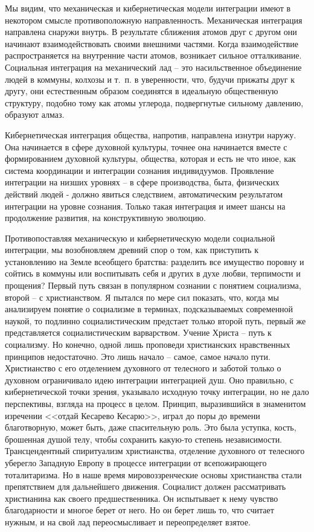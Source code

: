 \documentclass{book}
\begin{document}
Мы видим, что механическая и кибернетическая модели ин­теграции имеют в некотором смысле противоположную на­правленность. Механическая интеграция направлена снаружи внутрь. В результате сближения атомов друг с другом они на­чинают взаимодействовать своими внешними частями. Когда взаимодействие распространяется на внутренние части атомов, возникает сильное отталкивание. Социальная интеграция на механический лад -- это насильственное объединение людей в коммуны, колхозы и т.~п. в уверенности, что, будучи прижаты друг к другу, они естественным образом соединятся в идеаль­ную общественную структуру, подобно тому как атомы углерода, подвергнутые сильному давлению, образуют алмаз.

Кибернетическая интеграция общества, напротив, направ­лена изнутри наружу. Она начинается в сфере духовной куль­туры, точнее она начинается вместе с  формированием духов­ной культуры, общества, которая и есть не что иное, как си­стема координации и интеграции сознания индивидуумов. Про­явление интеграции на низших уровнях -- в сфере производст­ва, быта, физических действий людей - должно явиться следст­вием, автоматическим результатом интеграции на уровне со­знания. Только такая интеграция и имеет шансы на продолже­ние развития, на конструктивную эволюцию.

Противопоставляя механическую и кибернетическую моде­ли социальной интеграции, мы возобновляем древний спор о том, как приступить к установлению на Земле всеобщего братст­ва: разделить все имущество поровну и сойтись в коммуны или воспитывать себя и других в духе любви, терпимости и про­щения? Первый путь связан в популярном сознании с понятием социализма, второй -- с христианством. Я пытался по мере сил показать, что, когда мы анализируем понятие о социализме в терминах, подсказываемых современной наукой, то подлинно социалистическим предстает только второй путь, первый же представляется социалистическим варварством. Учение Христа -- путь к социализму. Но конечно, одной лишь проповеди хри­стианских нравственных принципов недостаточно. Это лишь на­чало -- самое, самое начало пути. Христианство с его отделением духовного от телесного и заботой только о духовном ограничи­вало идею интеграции интеграцией душ. Оно правильно, с кибернетической точки зрения, указывало исходную точку интег­рации, но не дало 
перспективы, взгляда на процесс в целом. Принцип, выразившийся в знаменитом изречении <<отдай Кесарево Кесарю>>, играл до поры до времени благотворную, может быть, даже спасительную роль. Это была уступка, кость, брошен­ная душой телу, чтобы сохранить какую-то степень независимости. Трансцендентный спиритуализм христианства, отделе­ние духовного от телесного уберегло Западную Европу в про­цессе интеграции от всепожирающего тоталитаризма. Но в наше время мировоззренческие основы христианства стали препятствием для дальнейшего движения. Социалист должен рассматривать христианина как своего предшественника. Он испытывает к нему чувство благодарности и многое берет от него. Но он берет лишь то, что считает нужным, и на свой лад переосмысливает и переопределяет взятое.
\end{document}
